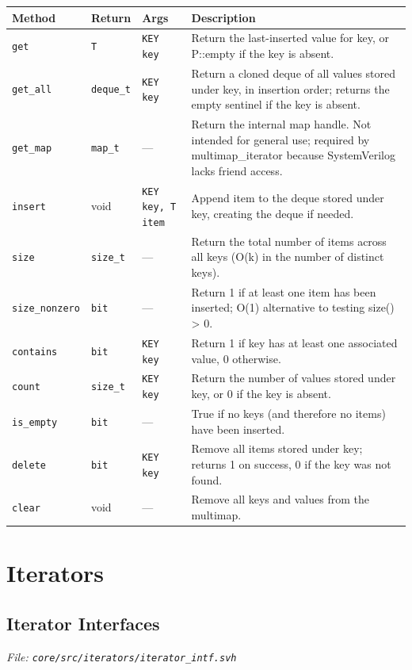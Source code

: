 \documentclass[11pt,letterpaper]{report}
\begin{document}
\begin{xltabular}{\linewidth}{>{\small}p{1.35in} >{\small}p{1.25in} >{\small}p{0.95in} >{\small}X}
\toprule
\textbf{Method} & \textbf{Return} & \textbf{Args} & \textbf{Description} \\
\midrule
\endhead
\bottomrule
\endfoot
\texttt{get} & \texttt{T} & \texttt{KEY key} & Return the last-inserted value for key, or P::empty if the key is absent. \\
\texttt{get\_all} & \texttt{deque\_t} & \texttt{KEY key} & Return a cloned deque of all values stored under key, in insertion order; returns the empty sentinel if the key is absent. \\
\texttt{get\_map} & \texttt{map\_t} & --- & Return the internal map handle. Not intended for general use; required by multimap\_iterator because SystemVerilog lacks friend access. \\
\texttt{insert} & void & \texttt{KEY key, T item} & Append item to the deque stored under key, creating the deque if needed. \\
\texttt{size} & \texttt{size\_t} & --- & Return the total number of items across all keys (O(k) in the number of distinct keys). \\
\texttt{size\_nonzero} & \texttt{bit} & --- & Return 1 if at least one item has been inserted; O(1) alternative to testing size() \textgreater{} 0. \\
\texttt{contains} & \texttt{bit} & \texttt{KEY key} & Return 1 if key has at least one associated value, 0 otherwise. \\
\texttt{count} & \texttt{size\_t} & \texttt{KEY key} & Return the number of values stored under key, or 0 if the key is absent. \\
\texttt{is\_empty} & \texttt{bit} & --- & True if no keys (and therefore no items) have been inserted. \\
\texttt{delete} & \texttt{bit} & \texttt{KEY key} & Remove all items stored under key; returns 1 on success, 0 if the key was not found. \\
\texttt{clear} & void & --- & Remove all keys and values from the multimap. \\
\end{xltabular}

\chapter{Iterators}
\section{Iterator Interfaces}
\noindent\small\textit{File: \texttt{core/src/iterators/iterator\_intf.svh}}\par
\end{document}
